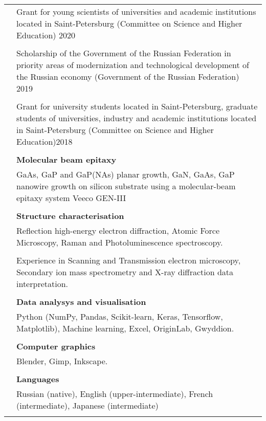 \documentclass[letterpaper, 11pt]{article}
\begin{document}
\begin{longtable}{p{1.3in}p{4.8in}}
		{\color{OliveGreen}{Honors and scholarships}}
        & Grant for young scientists of universities and academic institutions
        located in Saint-Petersburg (Committee on Science and Higher Education)
        \hfill 2020\\
		& \\
        & Scholarship of the Government of the Russian Federation in priority
        areas of modernization and technological development of the Russian
        economy (Government of the Russian Federation) \hfill 2019\\
		& \\
        & Grant for university students located in Saint-Petersburg, graduate
        students of universities, industry and academic institutions located in
        Saint-Petersburg (Committee on Science and Higher Education)\hfill 2018
        \\
		& \\
		
		
		{\color{OliveGreen}{Skills}}
		& \textbf{Molecular beam epitaxy} \\
        & GaAs, GaP and GaP(NAs) planar growth, GaN, GaAs, GaP nanowire growth
        on silicon substrate using a molecular-beam epitaxy system Veeco
        GEN-III \\
		& \\
		& \textbf{Structure characterisation} \\
        & Reflection high-energy electron diffraction, Atomic Force Microscopy,
        Raman and Photoluminescence spectroscopy. \\
		& \\
        & Experience in Scanning and Transmission electron microscopy,
        Secondary ion mass spectrometry and X-ray  diffraction data
        interpretation. \\
		& \\
		& \textbf{Data analysys and visualisation} \\
        & Python (NumPy, Pandas, Scikit-learn, Keras, Tensorflow,
        Matplotlib), Machine learning, Excel, OriginLab, Gwyddion. \\
        \\
		& \textbf{Computer graphics} \\
        & Blender, Gimp, Inkscape. \\ 
		& \\
		& \textbf{Languages} \\
        & Russian (native), English (upper-intermediate), French
        (intermediate), Japanese (intermediate) \\
		& \\
		

\end{longtable}
\end{document}
